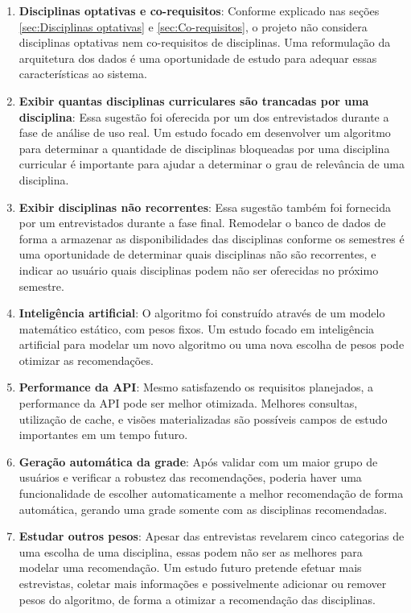 \begin{enumerate}
    \item \textbf{Disciplinas optativas e co-requisitos}: Conforme explicado nas seções \ref{sec:Disciplinas optativas} e \ref{sec:Co-requisitos}, o projeto não considera disciplinas optativas nem co-requisitos de disciplinas. Uma reformulação da arquitetura dos dados é uma oportunidade de estudo para adequar essas características ao sistema.

    \item \textbf{Exibir quantas disciplinas curriculares são trancadas por uma disciplina}: Essa sugestão foi oferecida por um dos entrevistados durante a fase de análise de uso real. Um estudo focado em desenvolver um algoritmo para determinar a quantidade de disciplinas bloqueadas por uma disciplina curricular é importante para ajudar a determinar o grau de relevância de uma disciplina.
    
    \item \textbf{Exibir disciplinas não recorrentes}: Essa sugestão também foi fornecida por um entrevistados durante a fase final. Remodelar o banco de dados de forma a armazenar as disponibilidades das disciplinas conforme os semestres é uma oportunidade de determinar quais disciplinas não são recorrentes, e indicar ao usuário quais disciplinas podem não ser oferecidas no próximo semestre.

    \item \textbf{Inteligência artificial}: O algoritmo foi construído através de um modelo matemático estático, com pesos fixos. Um estudo focado em inteligência artificial para modelar um novo algoritmo ou uma nova escolha de pesos pode otimizar as recomendações.
    
    \item \textbf{Performance da API}: Mesmo satisfazendo os requisitos planejados, a performance da API pode ser melhor otimizada. Melhores consultas, utilização de cache, e visões materializadas são possíveis campos de estudo importantes em um tempo futuro.
    
    \item \textbf{Geração automática da grade}: Após validar com um maior grupo de usuários e verificar a robustez das recomendações, poderia haver uma funcionalidade de escolher automaticamente a melhor recomendação de forma automática, gerando uma grade somente com as disciplinas recomendadas.
    
    \item \textbf{Estudar outros pesos}: Apesar das entrevistas revelarem cinco categorias de uma escolha de uma disciplina, essas podem não ser as melhores para modelar uma recomendação. Um estudo futuro pretende efetuar mais estrevistas, coletar mais informações e possivelmente adicionar ou remover pesos do algoritmo, de forma a otimizar a recomendação das disciplinas.
\end{enumerate}

